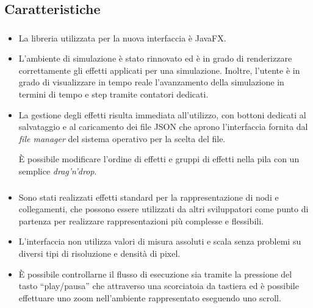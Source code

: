 \documentclass[%
]{beamer}
\newcommand{\engEmph}[1] {\emph{\foreignlanguage{english}#1}}
\begin{document}
    \subsection{Caratteristiche}\label{subsec:feature}
    \begin{frame}
        \frametitle{\insertsection}
        \framesubtitle{\insertsubsection}
        \begin{itemize}[<+(1)->]
            \item
                La libreria utilizzata per la nuova interfaccia è JavaFX.
            \item
                L'ambiente di simulazione è stato rinnovato ed è in grado di renderizzare correttamente gli effetti applicati per una simulazione.
                Inoltre, l'utente è in grado di visualizzare in tempo reale l'avanzamento della simulazione in termini di tempo e step tramite contatori dedicati.

            \item
                La gestione degli effetti risulta immediata all'utilizzo, con bottoni dedicati al salvataggio e al caricamento dei file JSON che aprono l'interfaccia fornita dal \engEmph{file manager} del sistema operativo per la scelta del file.

                È possibile modificare l'ordine di effetti e gruppi di effetti nella pila con un semplice \engEmph{drag'n'drop}.
        \end{itemize}
    \end{frame}

    \begin{frame}
        \frametitle{\insertsection}
        \framesubtitle{\insertsubsection}
        \begin{itemize}[<+(1)->]
            \item
                Sono stati realizzati effetti standard per la rappresentazione di nodi e collegamenti, che possono essere utilizzati da altri sviluppatori come punto di partenza per realizzare rappresentazioni più complesse e flessibili.

            \item
                L'interfaccia non utilizza valori di misura assoluti e scala senza problemi su diversi tipi di risoluzione e densità di pixel.

            \item
                È possibile controllarne il flusso di esecuzione sia tramite la pressione del tasto ``play/pausa'' che attraverso una scorciatoia da tastiera ed è possibile effettuare uno zoom nell'ambiente rappresentato eseguendo uno scroll.
        \end{itemize}
    \end{frame}
\end{document}
